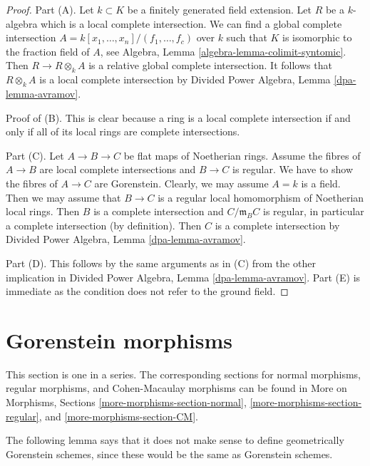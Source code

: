 \begin{proof}
Part (A). Let $k \subset K$ be a finitely generated field extension.
Let $R$ be a $k$-algebra which is a local complete intersection.
We can find a global complete intersection
$A = k[x_1, \ldots, x_n]/(f_1, \ldots, f_c)$
over $k$ such that $K$ is isomorphic to the fraction field of $A$, see
Algebra, Lemma \ref{algebra-lemma-colimit-syntomic}.
Then $R \to R \otimes_k A$ is a relative global complete intersection.
It follows that $R \otimes_k A$ is a local complete intersection
by Divided Power Algebra, Lemma \ref{dpa-lemma-avramov}.

\medskip\noindent
Proof of (B). This is clear
because a ring is a local complete intersection if and only if all of its
local rings are complete intersections.

\medskip\noindent
Part (C). Let $A \to B \to C$ be flat maps of Noetherian rings.
Assume the fibres of $A \to B$ are local complete intersections
and $B \to C$ is regular. We have to show the fibres of $A \to C$
are Gorenstein. Clearly, we may assume $A = k$ is a field.
Then we may assume that $B \to C$ is a regular local homomorphism
of Noetherian local rings. Then $B$ is a complete intersection and
$C/\mathfrak m_B C$ is regular, in particular a complete intersection
(by definition). Then $C$ is a complete intersection by
Divided Power Algebra, Lemma \ref{dpa-lemma-avramov}.

\medskip\noindent
Part (D). This follows by the same arguments as in (C) from
the other implication in
Divided Power Algebra, Lemma \ref{dpa-lemma-avramov}.
Part (E) is immediate as the condition does not refer to the ground
field.
\end{proof}






\section{Gorenstein morphisms}
\label{section-gorenstein-morphisms}

\noindent
This section is one in a series. The corresponding sections for
normal morphisms,
regular morphisms, and
Cohen-Macaulay morphisms
can be found in More on Morphisms, Sections
\ref{more-morphisms-section-normal},
\ref{more-morphisms-section-regular}, and
\ref{more-morphisms-section-CM}.

\medskip\noindent
The following lemma says that it does not make sense to define
geometrically Gorenstein schemes, since these would be the
same as Gorenstein schemes.

